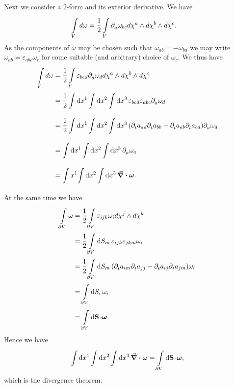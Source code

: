 Next we consider a $2$-form and its exterior derivative. We have
\begin{align*}
	\int\limits_{V}^{}{d\omega} &= \frac{1}{2}\int\limits_{V}^{}{\partial^{}_{a}{\omega_{bc}}d\chi^{a}\wedge d\chi^{b}\wedge d\chi^{c}}.
\end{align*}
As the components of $\omega$ may be chosen such that $\omega_{ab} = -\omega_{ba}$ we may write $\omega_{ab} = \varepsilon_{abc}\omega_{c}$ for some suitable (and arbitrary) choice of $\omega_{c}$. We thus have
\begin{align*}
	\int\limits_{V}^{}{d\omega} &= \frac{1}{2}\int\limits_{V}^{}{\varepsilon_{bcd}\partial^{}_{a}{\omega_{d}}d\chi^{a}\wedge d\chi^{b}\wedge d\chi^{c}} \\
	                        &= \frac{1}{2}\int\limits_{}^{}\dd{x^{1}}{\int\limits_{}^{}\dd{x^{2}}{\int\limits_{}^{}\dd{x^{3}}{\varepsilon_{bcd}\varepsilon_{abc}\ensuremath{\partial^{}_{a}}{\omega_{d}}}}} \\
	                        &= \frac{1}{2}\int\limits_{}^{}\dd{x^{1}}{\int\limits_{}^{}\dd{x^{2}}{\int\limits_{}^{}\dd{x^{3}}{(\ensuremath{\partial^{}_{t}}a_{ad}\ensuremath{\partial^{}_{t}}a_{bb} - \ensuremath{\partial^{}_{t}}a_{ab}\ensuremath{\partial^{}_{t}}a_{bd})\ensuremath{\partial^{}_{a}}{\omega_{d}}}}} \\
	                        &= \int\limits_{}^{}\dd{x^{1}}{\int\limits_{}^{}\dd{x^{2}}{\int\limits_{}^{}\dd{x^{3}}{\ensuremath{\partial^{}_{a}}{\omega_{a}}}}} \\
	                        &= \int\limits_{}^{}{x^{1}}{\int\limits_{}^{}\dd{x^{2}}{\int\limits_{}^{}\dd{x^{3}}{\div{\vb*{\omega}}}}}.
\end{align*}
At the same time we have
\begin{align*}
	\int\limits_{\partial V}^{}{\omega} &= \frac{1}{2}\int\limits_{\partial V}^{}{\varepsilon_{ijk}\omega_{i}d\chi^{j}\wedge d\chi^{k}} \\
	                           &= \frac{1}{2}\int\limits_{\partial V}^{}\dd{S_{m}}{\varepsilon_{ijk}\varepsilon_{jkm}\omega_{i}} \\
	                           &= \frac{1}{2}\int\limits_{\partial V}^{}\dd{S_{m}}{(\ensuremath{\partial^{}_{t}}a_{im}\ensuremath{\partial^{}_{t}}a_{jj} - \ensuremath{\partial^{}_{t}}a_{ij}\ensuremath{\partial^{}_{t}}a_{jm})\omega_{i}} \\
	                           &= \int\limits_{\partial V}^{}\dd{S_{i}}{\omega_{i}} \\
	                           &= \int\limits_{\partial V}^{}\dd{\vb{S}}{\cdot\vb*{\omega}}.
\end{align*}
Hence we have
\begin{align*}
	\int\limits_{}^{}\dd{x^{1}}{\int\limits_{}^{}\dd{x^{2}}{\int\limits_{}^{}\dd{x^{3}}{\div{\vb*{\omega}}}}} = \int\limits_{\partial V}^{}\dd{\vb{S}}{\cdot\vb*{\omega}},
\end{align*}
which is the divergence theorem.

